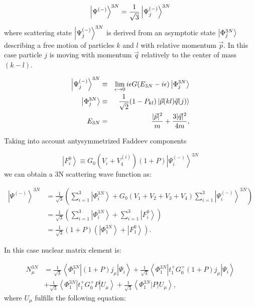     \begin{equation}
        \ket{\Psi^{(-)}}^{3N} = \frac{1}{\sqrt{3}}\ket{\Psi^{(-)}_j}^{3N}    
    \end{equation}
    where scattering state $\ket{\Psi^{(-)}_j}^{3N}$ is derived from an
    asymptotic state $\ket{\Phi^{3N}_j}$ describing a free motion
    of particles $k$ and $l$ with relative momentum $\vec{p}$. In this case
    particle $j$ is moving with momentum $\vec{q}$ relatively to the 
    center of mass $(k-l)$.

    \begin{eqnarray}
        \ket{\Psi^{(-)}_j}^{3N}  &\equiv& \lim_{\epsilon \rightarrow 0}
        i \epsilon G(E_{3N} - i\epsilon)\ket{\Phi^{3N}_j}\\
        \ket{\Phi^{3N}_j} &\equiv& \frac{1}{\sqrt{2}}(1 - P_{kl})
        \ket{\vec{p}(kl)\vec{q}(j)}\\
        E_{3N} &=& \frac{|\vec{p}|^2}{m} + \frac{3 |\vec{q}|^2}{4m},
    \end{eqnarray}

    Taking into account antysymmetrized Faddeev components

    \begin{equation}
        \left|F_i^0\right\rangle \equiv G_0\left(V_i+V_4^{(i)}\right)(1+P)\left|\Psi_i^{(-)}\right\rangle^{3 N}
        \label{faddeev_3n}
    \end{equation}
    we can obtain a 3N scattering wave function as:

    \begin{equation}
        \begin{aligned}
            \left|\Psi^{(-)}\right\rangle^{3 N} & =\frac{1}{\sqrt{3}}\left(\sum_{i=1}^3\left|\Phi_i^{3 N}\right\rangle+G_0\left(V_1+V_2+V_3+V_4\right) \sum_{i=1}^3\left|\Psi_i^{(-)}\right\rangle^{3 N}\right) \\
            & =\frac{1}{\sqrt{3}}\left(\sum_{i=1}^3\left|\Phi_i^{3 N}\right\rangle+\sum_{i=1}^3\left|F_i^0\right\rangle\right) \\
            & =\frac{1}{\sqrt{3}}(1+P)\left(\left|\Phi_1^{3 N}\right\rangle+\left|F_1^0\right\rangle\right) .
        \end{aligned}
        \label{3n_scat_psi}
    \end{equation}

    In this case nuclear matrix element is:

    \begin{equation}
        \begin{aligned}
            N_\mu^{3 N} & =\frac{1}{\sqrt{3}}\left\langle\Phi_1^{3 N}\left|(1+P) j_\mu\right| \Psi_i\right\rangle+\frac{1}{\sqrt{3}}\left\langle\Phi_1^{3 N}\left|t_1^{+} G_0^{+}(1+P) j_\mu\right| \Psi_i\right\rangle \\
            & +\frac{1}{\sqrt{3}}\left\langle\Phi_1^{3 N}\left|t_1^{+} G_0^{+} P\right| U_\mu\right\rangle+\frac{1}{\sqrt{3}}\left\langle\Phi_1^{3 N}|P| U_\mu\right\rangle,
            \end{aligned}
        \label{3n_matrix}
    \end{equation}
    where $ U_\mu$ fulfills the
    following equation:

